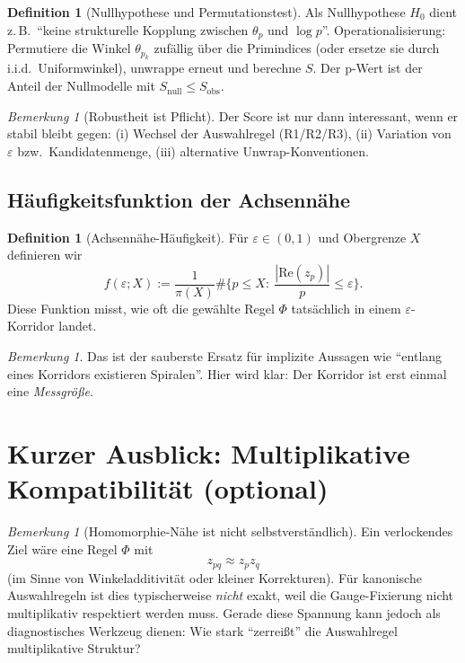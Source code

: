 \documentclass[a4paper,11pt]{article}
\theoremstyle{definition}
\newtheorem{definition}[satz]{Definition}
\theoremstyle{remark}
\newtheorem{bemerkung}[satz]{Bemerkung}
\newcommand{\Ree}{\mathrm{Re}}
\newcommand{\abs}[1]{\left|#1\right|}
\begin{document}
	\begin{definition}[Nullhypothese und Permutationstest]
		Als Nullhypothese \(H_0\) dient z.\,B.\ ``keine strukturelle Kopplung zwischen \(\theta_p\) und \(\log p\)''.
		Operationalisierung: Permutiere die Winkel \(\theta_{p_k}\) zufällig über die Primindices (oder ersetze sie durch i.i.d.\ Uniformwinkel),
		unwrappe erneut und berechne \(S\). Der p-Wert ist der Anteil der Nullmodelle mit \(S_{\mathrm{null}}\le S_{\mathrm{obs}}\).
	\end{definition}
	
	\begin{bemerkung}[Robustheit ist Pflicht]
		Der Score ist nur dann interessant, wenn er stabil bleibt gegen:
		(i) Wechsel der Auswahlregel (R1/R2/R3), (ii) Variation von \(\varepsilon\) bzw.\ Kandidatenmenge,
		(iii) alternative Unwrap-Konventionen.
	\end{bemerkung}
	
	\subsection{Häufigkeitsfunktion der Achsennähe}
	\begin{definition}[Achsennähe-Häufigkeit]
		Für \(\varepsilon\in(0,1)\) und Obergrenze \(X\) definieren wir
		\[
		f(\varepsilon;X):=\frac{1}{\pi(X)}\#\Big\{p\le X:\ \frac{\abs{\Ree(z_p)}}{p}\le \varepsilon\Big\}.
		\]
		Diese Funktion misst, wie oft die gewählte Regel \(\Phi\) tatsächlich in einem \(\varepsilon\)-Korridor landet.
	\end{definition}
	
	\begin{bemerkung}
		Das ist der sauberste Ersatz für implizite Aussagen wie ``entlang eines Korridors existieren Spiralen''.
		Hier wird klar: Der Korridor ist erst einmal eine \emph{Messgröße}.
	\end{bemerkung}
	
	\section{Kurzer Ausblick: Multiplikative Kompatibilität (optional)}
	\begin{bemerkung}[Homomorphie-Nähe ist nicht selbstverständlich]
		Ein verlockendes Ziel wäre eine Regel \(\Phi\) mit
		\[
		z_{pq}\approx z_p z_q
		\]
		(im Sinne von Winkeladditivität oder kleiner Korrekturen). Für kanonische Auswahlregeln ist dies typischerweise
		\emph{nicht} exakt, weil die Gauge-Fixierung nicht multiplikativ respektiert werden muss.
		Gerade diese Spannung kann jedoch als diagnostisches Werkzeug dienen: Wie stark ``zerreißt'' die Auswahlregel
		multiplikative Struktur?
	\end{bemerkung}
	
\end{document}
